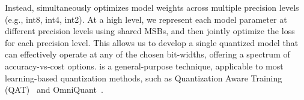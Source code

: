 


Instead, \alg simultaneously optimizes model weights across multiple precision levels (e.g., int8, int4, int2). At a high level, we represent each model parameter at different precision levels using shared MSBs, and then jointly optimize the loss for each precision level. This allows us to develop a single quantized model that can effectively operate at any of the chosen bit-widths, offering a spectrum of accuracy-vs-cost options. \alg is a general-purpose technique, applicable to most learning-based quantization methods, such as Quantization Aware Training (QAT)~\citep{jacob2018quantization} and OmniQuant~\citep{shao2023omniquant}.



